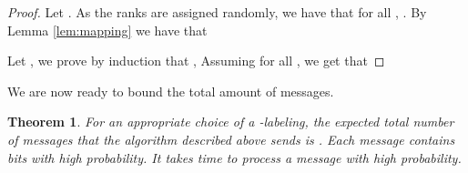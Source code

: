 \documentclass[11pt]{article}
\theoremstyle{plain}
\newtheorem{thm}{Theorem}[section]
\theoremstyle{definition}
\theoremstyle{remark}
\numberwithin{equation}{section}
\begin{document}
\begin{proof}

Let . As the ranks are assigned randomly,
we have that for all , . By Lemma \ref{lem:mapping} we have that






Let , we prove by induction that , Assuming  for all , we get that
\vspace*{-6pt}
    
\vspace*{-10pt}
 \end{proof}

We are now ready to bound the total amount of messages.

\begin{thm} \label{thm:32}
For an appropriate choice of a -labeling, the expected total
number of messages that the algorithm described above sends is
. Each message contains  bits
with high probability. It takes  time to process a
message with high probability.
\end{thm}
\end{document}
